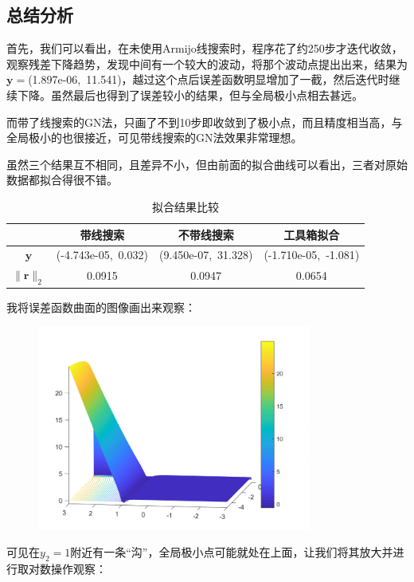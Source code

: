 \subsection{总结分析}
首先，我们可以看出，在未使用Armijo线搜索时，程序花了约250步才迭代收敛，观察残差下降趋势，发现中间有一个较大的波动，将那个波动点提出出来，结果为$\bm{y}=$(1.897e-06,\ 11.541)，越过这个点后误差函数明显增加了一截，然后迭代时继续下降。虽然最后也得到了误差较小的结果，但与全局极小点相去甚远。

而带了线搜索的GN法，只画了不到10步即收敛到了极小点，而且精度相当高，与全局极小的也很接近，可见带线搜索的GN法效果非常理想。

虽然三个结果互不相同，且差异不小，但由前面的拟合曲线可以看出，三者对原始数据都拟合得很不错。

\begin{table}[H]
\centering
\caption{拟合结果比较}
	\begin{tabular}{cccc}
	\toprule
	{}&带线搜索&不带线搜索&工具箱拟合\\
	\midrule
	$\bm{y}$&(-4.743e-05,\ 0.032)&(9.450e-07,\ 31.328)&	(-1.710e-05,\ -1.081)\\
	$\|\bm{r}\|_2$&	0.0915	&0.0947&0.0654\\
	\bottomrule
	\end{tabular}
\end{table}


我将误差函数曲面的图像画出来观察：


\begin{figure}[H]
\centering
\includegraphics[width=9cm]{fig/6_1.pdf}
\end{figure}

可见在$y_2=1$附近有一条“沟”，全局极小点可能就处在上面，让我们将其放大并进行取对数操作观察：

